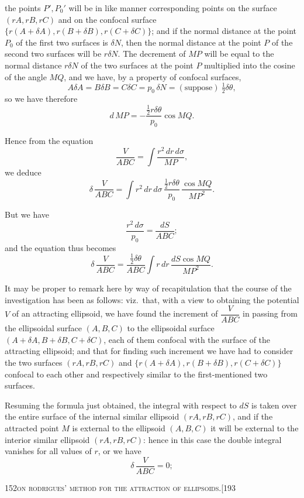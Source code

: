 \documentclass[11pt]{article}
\begin{document}
\medskip

\noindent the points $P', P_{0}'$ will be in like manner corresponding points on the surface $(rA, rB, rC)$ and on the confocal surface $\{r(A + \delta A), r(B + \delta B), r(C + \delta C)\}$; and if the normal distance at the point $P_{0}$ of the first two surfaces is $\delta N$, then the normal distance at the point $P$ of the second two surfaces will be $r\delta N$. The decrement of $MP$ will be equal to the normal distance $r\delta N$ of the two surfaces at the point $P$ multiplied into the cosine of the angle $MQ$, and we have, by a property of confocal surfaces,
\[
A\delta A = B\delta B = C\delta C = p_{0}\, \delta N = (\text{suppose})\ \tfrac{1}{2}\delta\theta,
\]
so we have therefore
\[
d\, MP = -\frac{\tfrac{1}{2} r\delta\theta}{p_{0}}\cos MQ.
\]

Hence from the equation
\[
\frac{V}{ABC} = \int \frac{r^{2}\, dr\, d\sigma}{MP},
\]
we deduce
\[
\delta\, \frac{V}{ABC} = \int r^{2}\, dr\, d\sigma\, \frac{\tfrac{1}{2} r\delta\theta}{p_{0}}\, \frac{\cos MQ}{MP^{2}}.
\]

But we have
\[
\frac{r^{2}\, d\sigma}{p_{0}} = \frac{dS}{ABC};
\]
and the equation thus becomes
\[
\delta\, \frac{V}{ABC} = \frac{\tfrac{1}{2}\delta\theta}{ABC}\int r\, dr\, \frac{dS\cos MQ}{MP^{2}}.
\]

It may be proper to remark here by way of recapitulation that the course of the investigation has been as follows: viz.\ that, with a view to obtaining the potential $V$ of an attracting ellipsoid, we have found the increment of $\dfrac{V}{ABC}$ in passing from the ellipsoidal surface $(A, B, C)$ to the ellipsoidal surface $(A + \delta A, B + \delta B, C + \delta C)$, each of them confocal with the surface of the attracting ellipsoid; and that for finding such increment we have had to consider the two surfaces $(rA, rB, rC)$ and $\{r(A + \delta A), r(B + \delta B), r(C + \delta C)\}$ confocal to each other and respectively similar to the first-mentioned two surfaces.

Resuming the formula just obtained, the integral with respect to $dS$ is taken over the entire surface of the internal similar ellipsoid $(rA, rB, rC)$, and if the attracted point $M$ is external to the ellipsoid $(A, B, C)$ it will be external to the interior similar ellipsoid $(rA, rB, rC)$: hence in this case the double integral vanishes for all values of $r$, or we have
\[
\delta\, \frac{V}{ABC} = 0;
\]

\bigskip

\begin{center}\small 152\hfill\textsc{on rodrigues' method for the attraction of ellipsoids.}\hfill [193\end{center}
\end{document}
